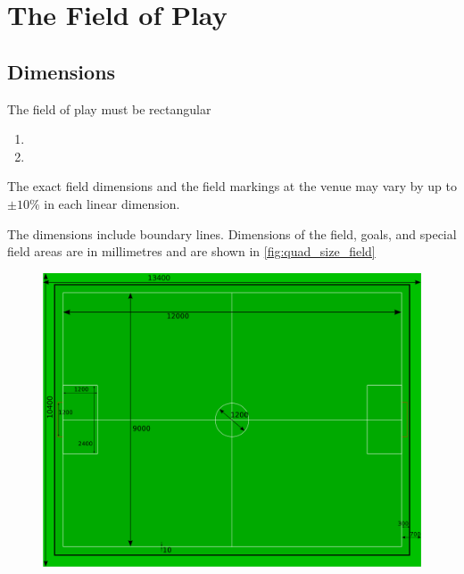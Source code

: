 \section{The Field of Play}\label{sec:field-of-play}

\subsection{Dimensions}
The field of play must be rectangular 

\begin{enumerate}
\item {}
\item {}
\end{enumerate} 

The exact field dimensions and the field markings at the venue may vary by up
to $\pm10\%$ in each linear dimension.

The dimensions include boundary lines.
Dimensions of the field, goals, and special field areas are in millimetres and
are shown in \autoref{fig:quad_size_field} 

\begin{figure}[ht] %
  \centering
  \includegraphics[width=0.8\columnwidth]{img/quad-size-field.png}
  \caption{}
  \label{fig:quad_size_field}
\end{figure}

